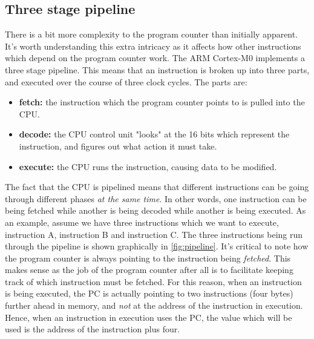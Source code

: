 \subsection{Three stage pipeline}
There is a bit more complexity to the program counter than initially apparent. It's worth understanding this extra intricacy as it affects how other instructions which depend on the program counter work. 
The ARM Cortex-M0 implements a three stage pipeline. This means that an instruction is broken up into three parts, and executed over the course of three clock cycles. The parts are:
\begin{itemize}
  \item \textbf{fetch:} the instruction which the program counter points to is pulled into the CPU.
  \item \textbf{decode:} the CPU control unit "looks" at the 16 bits which represent the instruction, and figures out what action it must take.
  \item \textbf{execute:} the CPU runs the instruction, causing data to be modified.
\end{itemize}
The fact that the CPU is pipelined means that different instructions can be going through different phases \emph{at the same time}. In other words, one instruction can be being fetched while another is being decoded while another is being executed. 
As an example, assume we have three instructions which we want to execute, instruction A, instruction B and instruction C. The three instructions being run through the pipeline is shown graphically in \autoref{fig:pipeline}. It's critical to note how the program counter is always pointing to the instruction being \emph{fetched}. This makes sense as the job of the program counter after all is to facilitate keeping track of which instruction must be fetched. For this reason, when an instruction is being executed, the PC is actually pointing to two instructions (four bytes) further ahead in memory, and \emph{not} at the address of the instruction in execution. Hence, when an instruction in execution uses the PC, the value which will be used is the address of the instruction plus four.
